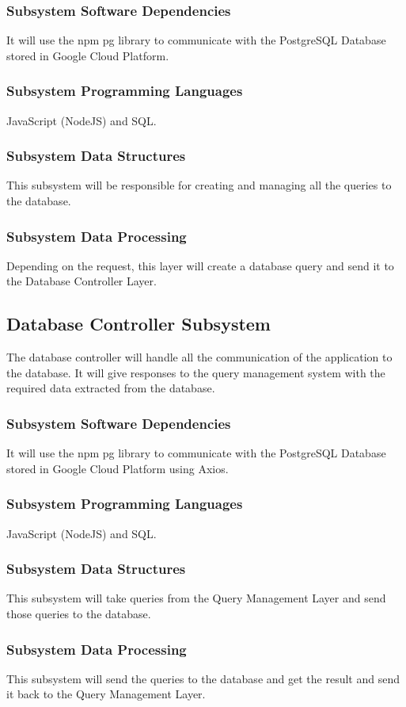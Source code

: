 \subsubsection{Subsystem Software Dependencies}
It will use the npm pg library to communicate with the PostgreSQL Database stored in Google Cloud Platform.

\subsubsection{Subsystem Programming Languages}
JavaScript (NodeJS) and SQL.

\subsubsection{Subsystem Data Structures}
This subsystem will be responsible for creating and managing all the queries to the database.

\subsubsection{Subsystem Data Processing}
Depending on the request, this layer will create a database query and send it to the Database Controller Layer.

\subsection{Database Controller Subsystem}
The database controller will handle all the communication of the application to the database. It will
give responses to the query management system with the required data extracted from the database.



\subsubsection{Subsystem Software Dependencies}
It will use the npm pg library to communicate with the PostgreSQL Database stored in Google Cloud Platform using Axios.

\subsubsection{Subsystem Programming Languages}
JavaScript (NodeJS) and SQL.

\subsubsection{Subsystem Data Structures}
This subsystem will take queries from the Query Management Layer and send those queries to the database.

\subsubsection{Subsystem Data Processing}
This subsystem will send the queries to the database and get the result and send it back to the Query Management Layer.